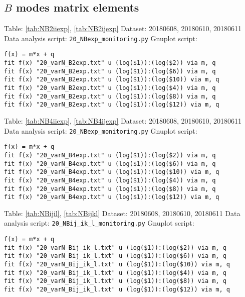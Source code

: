 \documentclass[12pt,a4paper]{article}
\begin{document}
\subsection{$B$ modes matrix elements}
Table: \ref{tab:NB2iiexp}, \ref{tab:NB2ijexp} \newline
Dataset: 20180608, 20180610, 20180611\newline
Data analysis script: \verb|20_NBexp_monitoring.py|\newline
Gnuplot script:
\begin{lstlisting}
f(x) = m*x + q
fit f(x) "20_varN_B2exp.txt" u (log($1)):(log($2)) via m, q
fit f(x) "20_varN_B2exp.txt" u (log($1)):(log($6)) via m, q
fit f(x) "20_varN_B2exp.txt" u (log($1)):(log($10)) via m, q
fit f(x) "20_varN_B2exp.txt" u (log($1)):(log($4)) via m, q
fit f(x) "20_varN_B2exp.txt" u (log($1)):(log($8)) via m, q
fit f(x) "20_varN_B2exp.txt" u (log($1)):(log($12)) via m, q
\end{lstlisting}
\mbox{}\newline
Table: \ref{tab:NB4iiexp}, \ref{tab:NB4ijexp} \newline
Dataset: 20180608, 20180610, 20180611\newline
Data analysis script: \verb|20_NBexp_monitoring.py|\newline
Gnuplot script:
\begin{lstlisting}
f(x) = m*x + q
fit f(x) "20_varN_B4exp.txt" u (log($1)):(log($2)) via m, q
fit f(x) "20_varN_B4exp.txt" u (log($1)):(log($6)) via m, q
fit f(x) "20_varN_B4exp.txt" u (log($1)):(log($10)) via m, q
fit f(x) "20_varN_B4exp.txt" u (log($1)):(log($4)) via m, q
fit f(x) "20_varN_B4exp.txt" u (log($1)):(log($8)) via m, q
fit f(x) "20_varN_B4exp.txt" u (log($1)):(log($12)) via m, q
\end{lstlisting}
\mbox{}\newline
Table: \ref{tab:NBijil}, \ref{tab:NBijkl} \newline
Dataset: 20180608, 20180610, 20180611\newline
Data analysis script: \verb|20_NBij_ik_l_monitoring.py|\newline
Gnuplot script:
\begin{lstlisting}
f(x) = m*x + q
fit f(x) "20_varN_Bij_ik_l.txt" u (log($1)):(log($2)) via m, q
fit f(x) "20_varN_Bij_ik_l.txt" u (log($1)):(log($6)) via m, q
fit f(x) "20_varN_Bij_ik_l.txt" u (log($1)):(log($10)) via m, q
fit f(x) "20_varN_Bij_ik_l.txt" u (log($1)):(log($4)) via m, q
fit f(x) "20_varN_Bij_ik_l.txt" u (log($1)):(log($8)) via m, q
fit f(x) "20_varN_Bij_ik_l.txt" u (log($1)):(log($12)) via m, q
\end{lstlisting}
\end{document}

